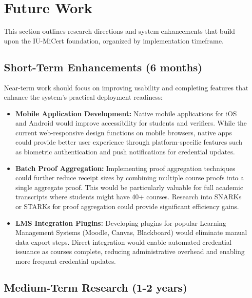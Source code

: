 \section{Future Work}
\label{sec:future-work}

This section outlines research directions and system enhancements that build upon the IU-MiCert foundation, organized by implementation timeframe.

\subsection{Short-Term Enhancements (6 months)}
\label{subsec:shortterm-future}

Near-term work should focus on improving usability and completing features that enhance the system's practical deployment readiness:

\begin{itemize}
    \item \textbf{Mobile Application Development:} Native mobile applications for iOS and Android would improve accessibility for students and verifiers. While the current web-responsive design functions on mobile browsers, native apps could provide better user experience through platform-specific features such as biometric authentication and push notifications for credential updates.

    \item \textbf{Batch Proof Aggregation:} Implementing proof aggregation techniques could further reduce receipt sizes by combining multiple course proofs into a single aggregate proof. This would be particularly valuable for full academic transcripts where students might have 40+ courses. Research into SNARKs or STARKs for proof aggregation could provide significant efficiency gains.

    \item \textbf{LMS Integration Plugins:} Developing plugins for popular Learning Management Systems (Moodle, Canvas, Blackboard) would eliminate manual data export steps. Direct integration would enable automated credential issuance as courses complete, reducing administrative overhead and enabling more frequent credential updates.
\end{itemize}

\subsection{Medium-Term Research (1-2 years)}
\label{subsec:mediumterm-future}

